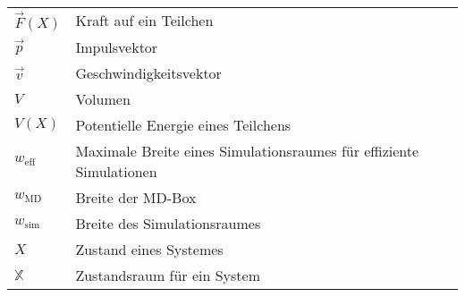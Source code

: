 {\begin{longtable}{ll}
$\vec F(X)$          & Kraft auf ein Teilchen                                              \\
$\vec p$             & Impulsvektor                                                        \\
$\vec v$             & Geschwindigkeitsvektor                                              \\
$V$                  & Volumen                                                             \\
$V(X)$               & Potentielle Energie eines Teilchens                                 \\
$w_\text{eff}$       & Maximale Breite eines Simulationsraumes für effiziente Simulationen \\
$w_\text{MD}$        & Breite der MD-Box                                                   \\
$w_\text{sim}$       & Breite des Simulationsraumes                                        \\
$X$                  & Zustand eines Systemes                                              \\
$\mathbb{X}$         & Zustandsraum für ein System                                         \\
\end{longtable}
}
